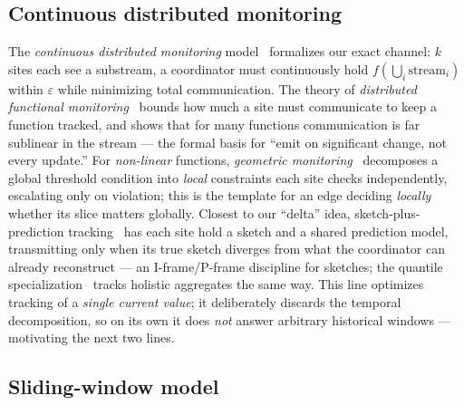 \subsection{Continuous distributed monitoring}

The \emph{continuous distributed monitoring} model~\cite{cormode2013survey}
formalizes our exact channel: $k$ sites each see a substream, a
coordinator must continuously hold $f(\bigcup_i \text{stream}_i)$ within
$\varepsilon$ while minimizing total communication. The theory of
\emph{distributed functional monitoring}~\cite{cormode2008functional}
bounds how much a site must communicate to keep a function tracked, and
shows that for many functions communication is far sublinear in the stream
--- the formal basis for ``emit on significant change, not every update.''
For \emph{non-linear} functions, \emph{geometric
monitoring}~\cite{sharfman2006geometric} decomposes a global threshold
condition into \emph{local} constraints each site checks independently,
escalating only on violation; this is the template for an edge deciding
\emph{locally} whether its slice matters globally. Closest to our
``delta'' idea, sketch-plus-prediction tracking~\cite{cormode2005sketching}
has each site hold a sketch and a shared prediction model, transmitting
only when its true sketch diverges from what the coordinator can already
reconstruct --- an I-frame/P-frame discipline for sketches; the quantile
specialization~\cite{cormode2005holistic} tracks holistic aggregates the
same way. This line optimizes tracking of a \emph{single current value};
it deliberately discards the temporal decomposition, so on its own it does
\emph{not} answer arbitrary historical windows --- motivating the next two
lines.

\subsection{Sliding-window model}


